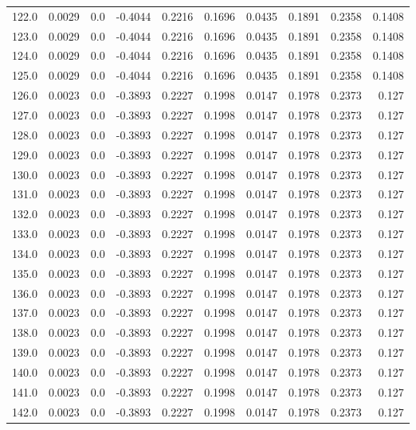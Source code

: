 \begin{longtable}{lrrrrrrrrr}
122.0 & 0.0029 & 0.0 & -0.4044 & 0.2216 & 0.1696 & 0.0435 & 0.1891 & 0.2358 & 0.1408 \\
123.0 & 0.0029 & 0.0 & -0.4044 & 0.2216 & 0.1696 & 0.0435 & 0.1891 & 0.2358 & 0.1408 \\
124.0 & 0.0029 & 0.0 & -0.4044 & 0.2216 & 0.1696 & 0.0435 & 0.1891 & 0.2358 & 0.1408 \\
125.0 & 0.0029 & 0.0 & -0.4044 & 0.2216 & 0.1696 & 0.0435 & 0.1891 & 0.2358 & 0.1408 \\
126.0 & 0.0023 & 0.0 & -0.3893 & 0.2227 & 0.1998 & 0.0147 & 0.1978 & 0.2373 & 0.127 \\
127.0 & 0.0023 & 0.0 & -0.3893 & 0.2227 & 0.1998 & 0.0147 & 0.1978 & 0.2373 & 0.127 \\
128.0 & 0.0023 & 0.0 & -0.3893 & 0.2227 & 0.1998 & 0.0147 & 0.1978 & 0.2373 & 0.127 \\
129.0 & 0.0023 & 0.0 & -0.3893 & 0.2227 & 0.1998 & 0.0147 & 0.1978 & 0.2373 & 0.127 \\
130.0 & 0.0023 & 0.0 & -0.3893 & 0.2227 & 0.1998 & 0.0147 & 0.1978 & 0.2373 & 0.127 \\
131.0 & 0.0023 & 0.0 & -0.3893 & 0.2227 & 0.1998 & 0.0147 & 0.1978 & 0.2373 & 0.127 \\
132.0 & 0.0023 & 0.0 & -0.3893 & 0.2227 & 0.1998 & 0.0147 & 0.1978 & 0.2373 & 0.127 \\
133.0 & 0.0023 & 0.0 & -0.3893 & 0.2227 & 0.1998 & 0.0147 & 0.1978 & 0.2373 & 0.127 \\
134.0 & 0.0023 & 0.0 & -0.3893 & 0.2227 & 0.1998 & 0.0147 & 0.1978 & 0.2373 & 0.127 \\
135.0 & 0.0023 & 0.0 & -0.3893 & 0.2227 & 0.1998 & 0.0147 & 0.1978 & 0.2373 & 0.127 \\
136.0 & 0.0023 & 0.0 & -0.3893 & 0.2227 & 0.1998 & 0.0147 & 0.1978 & 0.2373 & 0.127 \\
137.0 & 0.0023 & 0.0 & -0.3893 & 0.2227 & 0.1998 & 0.0147 & 0.1978 & 0.2373 & 0.127 \\
138.0 & 0.0023 & 0.0 & -0.3893 & 0.2227 & 0.1998 & 0.0147 & 0.1978 & 0.2373 & 0.127 \\
139.0 & 0.0023 & 0.0 & -0.3893 & 0.2227 & 0.1998 & 0.0147 & 0.1978 & 0.2373 & 0.127 \\
140.0 & 0.0023 & 0.0 & -0.3893 & 0.2227 & 0.1998 & 0.0147 & 0.1978 & 0.2373 & 0.127 \\
141.0 & 0.0023 & 0.0 & -0.3893 & 0.2227 & 0.1998 & 0.0147 & 0.1978 & 0.2373 & 0.127 \\
142.0 & 0.0023 & 0.0 & -0.3893 & 0.2227 & 0.1998 & 0.0147 & 0.1978 & 0.2373 & 0.127 \\

\end{longtable}
